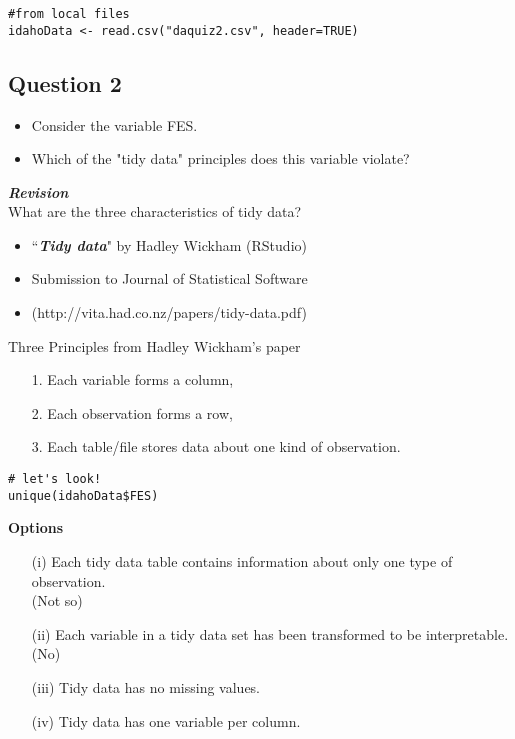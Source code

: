 \documentclass[]{article}
\begin{document}
\begin{framed}
\begin{verbatim}
#from local files
idahoData <- read.csv("daquiz2.csv", header=TRUE)

\end{verbatim}
\end{framed}

\newpage
\subsection*{ Question 2}

\begin{itemize}
\item Consider the variable FES. 
\item Which of the "tidy data" principles does this variable violate?
\end{itemize}

\textbf{\textit{Revision}}\\
What are the three characteristics of tidy data?

\begin{itemize}
\item ``\textit{\textbf{Tidy data}}" by Hadley Wickham (RStudio)
\item Submission to Journal of Statistical Software
\item (http://vita.had.co.nz/papers/tidy-data.pdf)
\end{itemize}
Three Principles from Hadley Wickham's paper
\begin{itemize}
\item[1.] Each variable forms a column, 
\item[2.] Each observation forms a row, 
\item[3.] Each table/file stores data about one kind of observation.
\end{itemize}

\begin{framed} 
\begin{verbatim}
# let's look!
unique(idahoData$FES)
\end{verbatim}
\end{framed} 
\textbf{Options}
\begin{itemize}
\item[(i)]  Each tidy data table contains information about only one type of observation.\\
(Not so)

\item[(ii)]  Each variable in a tidy data set has been transformed to be interpretable.
(No)

\item[(iii)]  Tidy data has no missing values.

\item[(iv)]  Tidy data has one variable per column.
\end{itemize}
  
\end{document}
